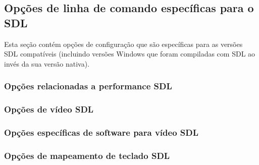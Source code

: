 \documentclass[letterpaper,10pt,brazil]{sphinxmanual}
\begin{document}
\subsection{Opções de linha de comando específicas para o SDL}
\label{commandline/commandline-index:opcoes-de-linha-de-comando-especificas-para-o-sdl}
Esta seção contém opções de configuração que são específicas para as
versões SDL compatíveis (incluindo versões Windows que foram compiladas
com SDL ao invés da sua versão nativa).


\subsubsection{Opções relacionadas a performance SDL}
\label{commandline/commandline-index:opcoes-relacionadas-a-performance-sdl}
\begin{DUlineblock}{0em}
\item[] {\hyperref[commandline/sdlconfig:mame\string-scommandline\string-sdlvideofps]{}}
\end{DUlineblock}


\subsubsection{Opções de vídeo SDL}
\label{commandline/commandline-index:opcoes-de-video-sdl}
\begin{DUlineblock}{0em}
\item[] {\hyperref[commandline/sdlconfig:mame\string-scommandline\string-centerh]{}}
\item[] {\hyperref[commandline/sdlconfig:mame\string-scommandline\string-centerv]{}}
\end{DUlineblock}


\subsubsection{Opções específicas de software para vídeo SDL}
\label{commandline/commandline-index:opcoes-especificas-de-software-para-video-sdl}
\begin{DUlineblock}{0em}
\item[] {\hyperref[commandline/sdlconfig:mame\string-scommandline\string-scalemode]{}}
\end{DUlineblock}


\subsubsection{Opções de mapeamento de teclado SDL}
\label{commandline/commandline-index:opcoes-de-mapeamento-de-teclado-sdl}
\begin{DUlineblock}{0em}
\item[] {\hyperref[commandline/sdlconfig:mame\string-scommandline\string-keymap]{}}
\item[] {\hyperref[commandline/sdlconfig:mame\string-scommandline\string-keymapfile]{}}
\end{DUlineblock}
\end{document}

